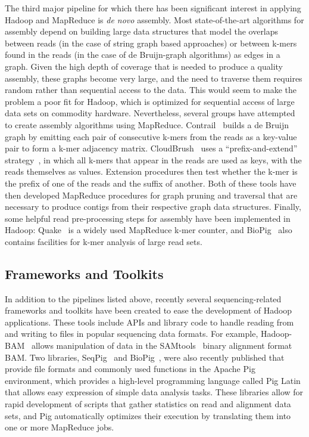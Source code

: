 The third major pipeline for which there has been significant interest in applying Hadoop and MapReduce is \emph{de novo} assembly. Most state-of-the-art algorithms for assembly depend on building large data structures that model the overlaps between reads (in the case of string graph based approaches) or between k-mers found in the reads (in the case of de Bruijn-graph algorithms) as edges in a graph. Given the high depth of coverage that is needed to produce a quality assembly, these graphs become very large, and the need to traverse them requires random rather than sequential access to the data. This would seem to make the problem a poor fit for Hadoop, which is optimized for sequential access of large data sets on commodity hardware. Nevertheless, several groups have attempted to create assembly algorithms using MapReduce. Contrail~\cite{schatz2010novo} builds a de Bruijn graph by emitting each pair of consecutive k-mers from the reads as a key-value pair to form a k-mer adjacency matrix. CloudBrush~\cite{Chang:2012hd} uses a ``prefix-and-extend'' strategy~\cite{10.1109/CLOUD.2012.123}, in which all k-mers that appear in the reads are used as keys, with the reads themselves as values. Extension procedures then test whether the k-mer is the prefix of one of the reads and the suffix of another. Both of these tools have then developed MapReduce procedures for graph pruning and traversal that are necessary to produce contigs from their respective graph data structures. Finally, some helpful read pre-processing steps for assembly have been implemented in Hadoop: Quake~\cite{Kelley:2010kg} is a widely used MapReduce k-mer counter, and BioPig~\cite{Nordberg:2013ka} also contains facilities for k-mer analysis of large read sets.

\subsection{Frameworks and Toolkits}

In addition to the pipelines listed above, recently several sequencing-related frameworks and toolkits have been created to ease the development of Hadoop applications. These tools include APIs and library code to handle reading from and writing to files in popular sequencing data formats. For example, Hadoop-BAM~\cite{Niemenmaa:2012hu} allows manipulation of data in the SAMtools~\cite{Li:2009vz} binary alignment format BAM. Two libraries, SeqPig~\cite{Schumacher:2013kh} and BioPig~\cite{Nordberg:2013ka}, were also recently published that provide file formats and commonly used functions in the Apache Pig~\cite{pig} environment, which provides a high-level programming language called Pig Latin that allows easy expression of simple data analysis tasks. These libraries allow for rapid development of scripts that gather statistics on read and alignment data sets, and Pig automatically optimizes their execution by translating them into one or more MapReduce jobs. 

